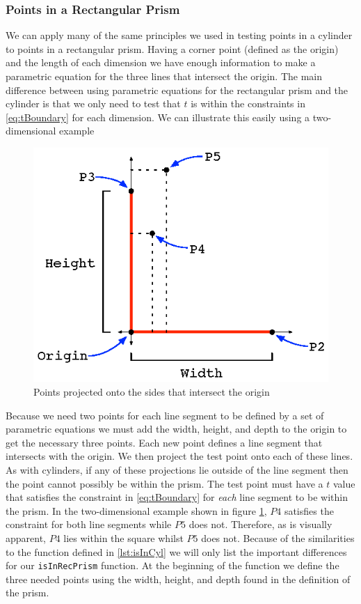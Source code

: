 \documentclass[authoryearcitations]{UoYCSproject}
\begin{document}
\subsubsection{Points in a Rectangular Prism}
We can apply many of the same principles we used in testing points in a cylinder to points in a rectangular prism.
Having a corner point (defined as the origin) and the length of each dimension we have enough information to make a
parametric equation for the three lines that intersect the origin. The main difference between using parametric 
equations for the rectangular prism and the cylinder is that we only need to test that $t$ is within the constraints 
in \ref{eq:tBoundary} for each dimension. We can illustrate this easily using a two-dimensional example

\begin{figure}[h!]
  \centering
  \includegraphics[scale=1.2]{figures/recPrism.eps}
  \caption{Points projected onto the sides that intersect the origin}
\label{recPrism}
\end{figure}

Because we need two points for each line segment to be defined by a set of parametric equations we must add the
width, height, and depth to the origin to get the necessary three points. Each new point defines a line segment 
that intersects with the origin. We then project the test point onto each of these lines. As with cylinders,
if any of these projections lie outside of the line segment then the point cannot possibly be within the prism. 
The test point must have a $t$ value that satisfies the constraint in \ref{eq:tBoundary} for \emph{each} line segment
to be within the prism. In the two-dimensional example shown in figure \ref{recPrism}, $P4$ satisfies the constraint
for both line segments while $P5$ does not. Therefore, as is visually apparent, $P4$ lies within the square whilst 
$P5$ does not. Because of the similarities to the function defined in \ref{lst:isInCyl} we will only list the
important differences for our \verb+isInRecPrism+ function. At the beginning of the function we define the three needed
points using the width, height, and depth found in the definition of the prism. 
\end{document}
